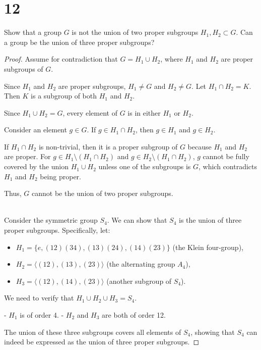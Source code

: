 \documentclass{article}
\begin{document}
\section*{12}
Show that a group $G$ is not the union of two proper subgroups $H_1, H_2 \subset G$. Can a group be the union of three proper subgroups?
\begin{proof}
    
Assume for contradiction that \( G = H_1 \cup H_2 \), where \( H_1 \) and \( H_2 \) are proper subgroups of \( G \). 

Since \( H_1 \) and \( H_2 \) are proper subgroups, \( H_1 \neq G \) and \( H_2 \neq G \). Let \( H_1 \cap H_2 = K \). Then \( K \) is a subgroup of both \( H_1 \) and \( H_2 \). 

Since \( H_1 \cup H_2 = G \), every element of \( G \) is in either \( H_1 \) or \( H_2 \). 

Consider an element \( g \in G \). If \( g \in H_1 \cap H_2 \), then \( g \in H_1 \) and \( g \in H_2 \). 

If \( H_1 \cap H_2 \) is non-trivial, then it is a proper subgroup of \( G \) because \( H_1 \) and \( H_2 \) are proper. For \( g \in H_1 \setminus (H_1 \cap H_2) \) and \( g \in H_2 \setminus (H_1 \cap H_2) \), \( g \) cannot be fully covered by the union \( H_1 \cup H_2 \) unless one of the subgroups is \( G \), which contradicts \( H_1 \) and \( H_2 \) being proper. 

Thus, \( G \) cannot be the union of two proper subgroups.

\leavevmode \\ 

Consider the symmetric group \( S_4 \). We can show that \( S_4 \) is the union of three proper subgroups. Specifically, let:

\begin{itemize}
    \item \( H_1 = \{ e, (12)(34), (13)(24), (14)(23) \} \) (the Klein four-group),
    \item \( H_2 = \langle (12), (13), (23) \rangle \) (the alternating group \( A_4 \)),
    \item \( H_3 = \langle (12), (14), (23) \rangle \) (another subgroup of \( S_4 \)).
\end{itemize}

We need to verify that \( H_1 \cup H_2 \cup H_3 = S_4 \). 

- \( H_1 \) is of order 4.
- \( H_2 \) and \( H_3 \) are both of order 12.

The union of these three subgroups covers all elements of \( S_4 \), showing that \( S_4 \) can indeed be expressed as the union of three proper subgroups.

\end{proof}
\end{document}
